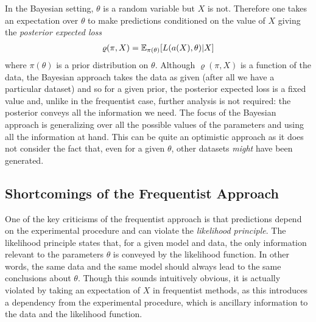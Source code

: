 In the Bayesian setting, $\theta$ is a random variable but $X$ is not.  Therefore one takes an expectation over $\theta$
to make predictions conditioned on the value of $X$ giving the \emph{posterior expected loss}~\cite{robert2007bayesian}
\begin{align}
\label{eq:bayes:bayes-est}
\varrho(\pi,X) = \mathbb{E}_{\pi(\theta)} [L(a(X),\theta) | X]
\end{align}
where $\pi(\theta)$ is a prior distribution on $\theta$.  Although $\varrho(\pi,X)$ is a function of the data, the Bayesian
approach takes the data as given (after all we have a particular dataset) and so for a given prior, the posterior
expected loss is a fixed value and, unlike in the frequentist case, further analysis is not required: the posterior
conveys all the information we need.  The focus of the Bayesian approach is generalizing over all the possible values of
the parameters and using all the information at hand.  
This can be quite an optimistic approach as it does not consider the fact that, even for a given $\theta$,
other datasets \emph{might} have been generated.  

\subsection{Shortcomings of the Frequentist Approach}
\label{sec:bayes:religion:freq}

One of the key criticisms of the frequentist approach is that predictions depend on the experimental procedure and
can violate the \emph{likelihood principle}.  The likelihood principle states that, for a given model and data, the only information relevant
to the parameters $\theta$ is conveyed by the likelihood function.  In other words, the same data and the same model should
always lead to the same conclusions about $\theta$.  Though this sounds intuitively obvious, it is actually violated by
taking an expectation of $X$ in frequentist methods, as this introduces a dependency from the experimental procedure, which
is ancillary information to the data and the likelihood function.  

